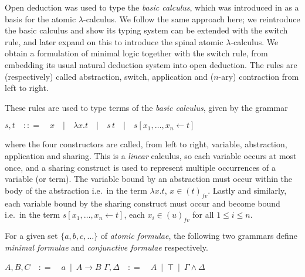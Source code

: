 \documentclass[a4paper,UKenglish,cleveref, autoref]{lipics-v2019}
\makeatletter
\newcommand{\fv}[1]{(#1)_{fv}}
\newcommand{\set}[1]{ \{ #1 \} }
\newcommand{\abs}[2]{\lambda #1 . #2}
\newcommand{\app}[2]{#1 \, #2}
\newcommand{\share}[3]{#1 [#2 \leftarrow #3]}
\newcommand{\sharerule}{\triangle}
\newcommand{\apprule}{@}
\newcommand{\lamrule}{\lambda}
\makeatother
\begin{document}
Open deduction was used to type the \emph{basic calculus}, which was introduced in \cite{gundersen2013atomic} as a basis for the atomic $\lambda$-calculus. We follow the same approach here; we reintroduce the basic calculus and show its typing system can be extended with the switch rule, and later expand on this to introduce the spinal atomic $\lambda$-calculus. We obtain a formulation of minimal logic together with the switch rule, from embedding its usual natural deduction system into open deduction. The rules are (respectively) called abstraction, switch, application and ($n$-ary) contraction from left to right.
\begin{center}
\drv{\top ; -[\lamrule] ; A \rightarrow A}
\hspace{0.5cm}
\hspace{0.5cm}
\drv{A \wedge (A \rightarrow B) ; -[\apprule] ; B}
\hspace{0.5cm}
\drv{A ; -[\sharerule] ; A \wedge \dots \wedge A}
\end{center}
These rules are used to type terms of the \emph{basic calculus}, given by the grammar
\begin{definition}
\label{def:basiccalc}
\quad $s, t \quad {:}{:}{=} \quad x \quad \vert \quad \abs{x}{t} \quad \vert \quad \app{s}{t} \quad \vert \quad \share{s}{x_{1}, \dots, x_{n}}{t}$
\end{definition}
where the four constructors are called, from left to right, variable, abstraction, application and sharing. This is a \emph{linear} calculus, so each variable occurs at most once, and a sharing construct is used to represent multiple occurrences of a variable (or term). The variable bound by an abstraction must occur within the body of the abstraction i.e.\ in the term $\abs{x}{t}$, $x \in \fv{t}$. Lastly and similarly, each variable bound by the sharing construct must occur and become bound i.e.\ in the term $\share{s}{x_{1}, \dots, x_{n}}{t}$, each $x_{i} \in \fv{u}$ for all $1 \leq i \leq n$. 


For a given set $\set{a, b, c, \dots}$ of \emph{atomic formulae}, the following two grammars define \emph{minimal formulae} and \emph{conjunctive formulae} respectively.

\begin{center}
$A, B, C \quad {:}{=} \quad a \, \, \, \vert \, \, \, A \rightarrow B$ \hspace{1cm} $\Gamma, \Delta \quad {:}{=} \quad A \, \, \, \vert \, \, \, \top \, \, \, \vert \, \, \, \Gamma \wedge \Delta$
\end{center}
\end{document}
